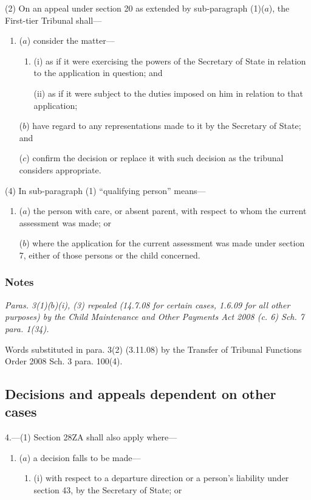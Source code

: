 \documentclass[a4paper]{article}
\newcommand\amendment[1]{\subsubsection*{Notes}{\itshape\frenchspacing\footnotesize #1 \par}}
\begin{document}
{(2) On an appeal under section 20 as extended by sub-paragraph (1)($a$), the First-tier Tribunal shall---
\begin{enumerate}\item[]
($a$) consider the matter---
\begin{enumerate}\item[]
(i) as if it were exercising the powers of the Secretary of State in relation to the application in question; and

(ii) as if it were subject to the duties imposed on him in relation to that application;
\end{enumerate}

($b$) have regard to any representations made to it by the Secretary of State; and

($c$) confirm the decision or replace it with such decision as the tribunal considers appropriate.
\end{enumerate}


(4) In sub-paragraph (1) “qualifying person” means---
\begin{enumerate}\item[]
($a$) the person with care, or absent parent, with respect to whom the current assessment was made; or

($b$) where the application for the current assessment was made under section 7, either of those persons or the child concerned.
\end{enumerate}

\amendment{
Paras. 3(1)($b$)(i), (3) repealed (14.7.08 for certain cases, 1.6.09 for all other purposes) by the Child Maintenance and Other Payments Act 2008 (c. 6) Sch. 7 para. 1(34).

Words substituted in para. 3(2) (3.11.08) by the Transfer of Tribunal Functions Order 2008  Sch. 3 para. 100(4).
}

\subsection*{Decisions and appeals dependent on other cases}

4.---(1) Section 28ZA shall also apply where---
\begin{enumerate}\item[]
($a$) a decision falls to be made—
\begin{enumerate}\item[]
(i) with respect to a departure direction
 or a person’s liability under section 43, by the Secretary of State; or


\end{enumerate}
\end{enumerate}}
\end{document}
